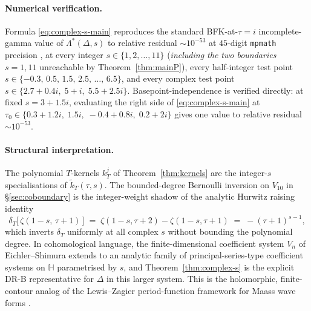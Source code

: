 \documentclass[11pt,letterpaper]{article}
\newcommand{\HH}{\mathbb{H}}
\begin{document}
\paragraph{Numerical verification.}
Formula \eqref{eq:complex-s-main} reproduces the standard BFK-at-$\tau=i$ incomplete-gamma value of $\Lambda^*(\Delta, s)$ to relative residual $\sim 10^{-53}$ at $45$-digit \texttt{mpmath} precision \cite{ComplexSScript}, at every integer $s \in \{1, 2, \ldots, 11\}$ (\emph{including the two boundaries} $s = 1, 11$ unreachable by Theorem~\ref{thm:mainP}), every half-integer test point $s \in \{-0.3,\,0.5,\,1.5,\,2.5,\,\ldots,\,6.5\}$, and every complex test point $s \in \{2.7 + 0.4i,\;5 + i,\;5.5 + 2.5i\}$.  Basepoint-independence is verified directly: at fixed $s = 3 + 1.5i$, evaluating the right side of \eqref{eq:complex-s-main} at $\tau_0 \in \{0.3 + 1.2i,\;1.5i,\;-0.4 + 0.8i,\;0.2 + 2i\}$ gives one value to relative residual $\sim 10^{-53}$.

\paragraph{Structural interpretation.}
The polynomial $T$-kernels $k_T^j$ of Theorem~\ref{thm:kernels} are the integer-$s$ specialisations of $\widetilde{k}_T(\tau, s)$.  The bounded-degree Bernoulli inversion on $V_{10}$ in \S\ref{sec:coboundary} is the integer-weight shadow of the analytic Hurwitz raising identity
\[
  \delta_T\!\bigl[\,\zeta(1 - s,\,\tau + 1)\,\bigr] \;=\; \zeta(1-s, \tau+2) - \zeta(1-s, \tau+1) \;=\; -(\tau+1)^{s-1},
\]
which inverts $\delta_T$ uniformly at all complex $s$ without bounding the polynomial degree.  In cohomological language, the finite-dimensional coefficient system $V_n$ of Eichler--Shimura extends to an analytic family of principal-series-type coefficient systems on $\HH$ parametrised by $s$, and Theorem~\ref{thm:complex-s} is the explicit DR-B representative for $\Delta$ in this larger system.  This is the holomorphic, finite-contour analog of the Lewis--Zagier period-function framework for Maass wave forms \cite{LewisZagier2001}.
\end{document}
